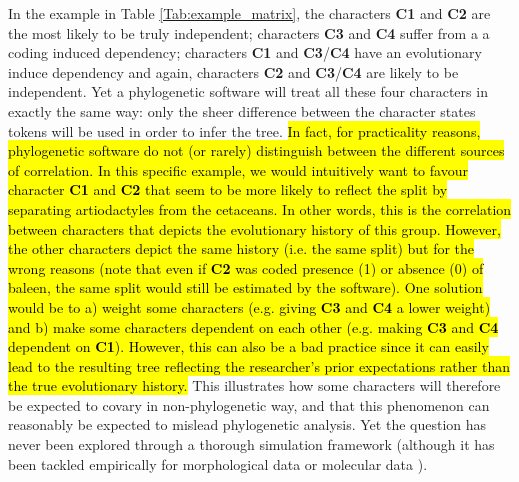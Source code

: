 \documentclass[12pt,letterpaper]{article}
\begin{document}
In the example in Table \ref{Tab:example_matrix}, the characters \textbf{C1} and \textbf{C2} are the most likely to be truly independent; characters \textbf{C3} and \textbf{C4} suffer from a a coding induced dependency; characters \textbf{C1} and \textbf{C3}/\textbf{C4} have an evolutionary induce dependency and again, characters \textbf{C2} and \textbf{C3}/\textbf{C4} are likely to be independent.
Yet a phylogenetic software will treat all these four characters in exactly the same way: only the sheer difference between the character states tokens will be used in order to infer the tree.
\hl{In fact, for practicality reasons, phylogenetic software do not (or rarely) distinguish between the different sources of correlation.
In this specific example, we would intuitively want to favour character \textbf{C1} and \textbf{C2} that seem to be more likely to reflect the split by separating artiodactyles from the cetaceans.
In other words, this is the correlation between characters that depicts the evolutionary history of this group.
However, the other characters depict the same history (i.e. the same split) but for the wrong reasons (note that even if \textbf{C2} was coded presence (1) or absence (0) of baleen, the same split would still be estimated by the software).
One solution would be to a) weight some characters (e.g. giving \textbf{C3} and \textbf{C4} a lower weight) and b) make some characters dependent on each other (e.g. making \textbf{C3} and \textbf{C4} dependent on \textbf{C1}).
However, this can also be a bad practice since it can easily lead to the resulting tree reflecting the researcher's prior expectations rather than the true evolutionary history.}
This illustrates how some characters will therefore be expected to covary in non-phylogenetic way, and that this phenomenon can reasonably be expected to mislead phylogenetic analysis.
Yet the question has never been explored through a thorough simulation framework (although it has been tackled empirically for morphological data \citealt{Davalos01072014} or molecular data \citealt{ZouConvergence}).
\end{document}
